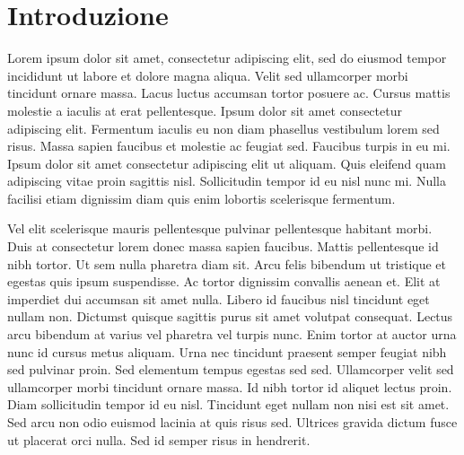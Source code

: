 \chapter{Introduzione}

\begin{comment}
Ciò che viene scritto in questo enviroment non sarà mostrato nel pdf.
Questo comando è utile per nascondere un intero paragrafo senza eliminarlo dal file sorgente. 
\end{comment}

Lorem ipsum dolor sit amet, consectetur adipiscing elit, sed do eiusmod tempor incididunt ut labore et dolore magna aliqua. Velit sed ullamcorper morbi tincidunt ornare massa. Lacus luctus accumsan tortor posuere ac. Cursus mattis molestie a iaculis at erat pellentesque. Ipsum dolor sit amet consectetur adipiscing elit. Fermentum iaculis eu non diam phasellus vestibulum lorem sed risus. Massa sapien faucibus et molestie ac feugiat sed. Faucibus turpis in eu mi. Ipsum dolor sit amet consectetur adipiscing elit ut aliquam. Quis eleifend quam adipiscing vitae proin sagittis nisl. Sollicitudin tempor id eu nisl nunc mi. Nulla facilisi etiam dignissim diam quis enim lobortis scelerisque fermentum.

Vel elit scelerisque mauris pellentesque pulvinar pellentesque habitant morbi. Duis at consectetur lorem donec massa sapien faucibus. Mattis pellentesque id nibh tortor. Ut sem nulla pharetra diam sit. Arcu felis bibendum ut tristique et egestas quis ipsum suspendisse. Ac tortor dignissim convallis aenean et. Elit at imperdiet dui accumsan sit amet nulla. Libero id faucibus nisl tincidunt eget nullam non. Dictumst quisque sagittis purus sit amet volutpat consequat. Lectus arcu bibendum at varius vel pharetra vel turpis nunc. Enim tortor at auctor urna nunc id cursus metus aliquam. Urna nec tincidunt praesent semper feugiat nibh sed pulvinar proin. Sed elementum tempus egestas sed sed. Ullamcorper velit sed ullamcorper morbi tincidunt ornare massa. Id nibh tortor id aliquet lectus proin. Diam sollicitudin tempor id eu nisl. Tincidunt eget nullam non nisi est sit amet. Sed arcu non odio euismod lacinia at quis risus sed. Ultrices gravida dictum fusce ut placerat orci nulla. Sed id semper risus in hendrerit.

